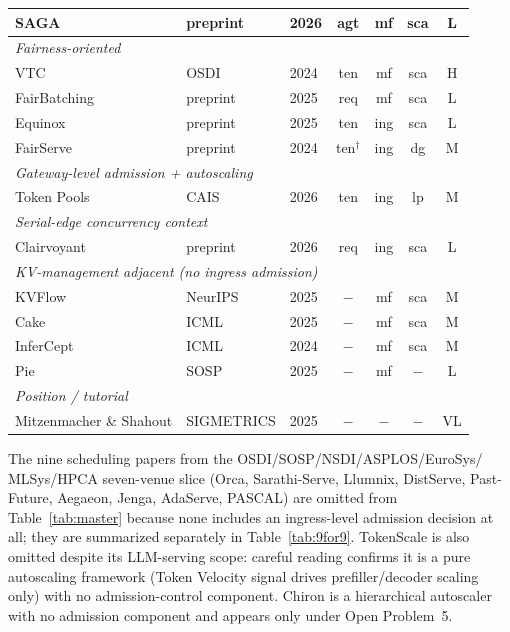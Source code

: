 \documentclass[10pt]{article} %
\theoremstyle{definition}
\begin{document}
\begin{table}[htbp]
{\begin{tabular}{l l l c c c c}
SAGA                    & preprint   & 2026 & agt & mf  & sca  & L \\
\midrule
\multicolumn{7}{l}{\textit{Fairness-oriented}} \\
VTC                     & OSDI       & 2024 & ten & mf  & sca  & H \\
FairBatching            & preprint   & 2025 & req & mf  & sca  & L \\
Equinox                 & preprint   & 2025 & ten & ing & sca  & L \\
FairServe               & preprint   & 2024 & ten$^\dagger$ & ing & dg  & M \\
\midrule
\multicolumn{7}{l}{\textit{Gateway-level admission + autoscaling}} \\
Token Pools             & CAIS       & 2026 & ten & ing & lp   & M \\
\midrule
\multicolumn{7}{l}{\textit{Serial-edge concurrency context}} \\
Clairvoyant             & preprint   & 2026 & req & ing & sca  & L \\
\midrule
\multicolumn{7}{l}{\textit{KV-management adjacent (no ingress admission)}} \\
KVFlow                  & NeurIPS    & 2025 & $-$ & mf  & sca  & M \\
Cake                    & ICML       & 2025 & $-$ & mf  & sca  & M \\
InferCept               & ICML       & 2024 & $-$ & mf  & sca  & M \\
Pie                     & SOSP       & 2025 & $-$ & mf  & $-$  & L \\
\midrule
\multicolumn{7}{l}{\textit{Position / tutorial}} \\
Mitzenmacher \& Shahout & SIGMETRICS & 2025 & $-$ & $-$ & $-$  & VL \\
\bottomrule
\end{tabular}%
}
\end{table}

The nine scheduling papers from the OSDI/SOSP/NSDI/ASPLOS/EuroSys/
MLSys/HPCA seven-venue slice (Orca, Sarathi-Serve, Llumnix,
DistServe, Past-Future, Aegaeon, Jenga, AdaServe, PASCAL) are
omitted from Table~\ref{tab:master} because none includes an
ingress-level admission decision at all; they are summarized
separately in Table~\ref{tab:9for9}. TokenScale
\citep{lai2025tokenscale} is also omitted despite its LLM-serving
scope: careful reading confirms it is a pure autoscaling framework
(Token Velocity signal drives prefiller/decoder scaling only) with
no admission-control component. Chiron \citep{patke2025chiron} is a
hierarchical autoscaler with no admission component and appears
only under Open Problem~5.
\end{document}
